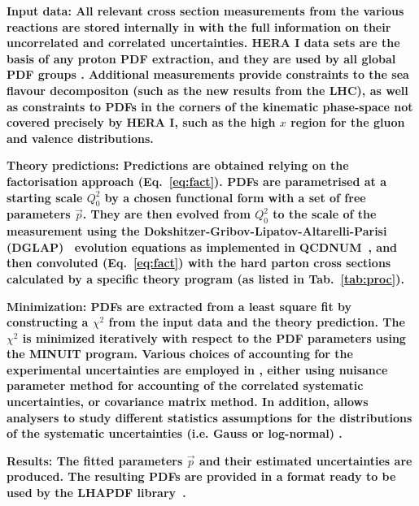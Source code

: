 \begin{description}
\item 
\bf {Input data:} \rm  All relevant cross section measurements from the various reactions
are stored internally in \fitter with the full information on their uncorrelated and correlated
uncertainties. HERA I data sets are the basis of any proton PDF extraction, and they are used by all global PDF groups \cite{MSTW, CT, NNPDF, ABM, JR}. Additional measurements provide constraints to the sea flavour decompositon (such as the new results from the LHC), as well as constraints to PDFs in the corners of the kinematic phase-space not covered precisely by HERA I, such as the high $x$ region for the gluon and valence distributions.
\item
\bf{Theory predictions:} \rm Predictions are obtained relying on the factorisation approach (Eq.~\ref{eq:fact}). PDFs are parametrised at a starting scale $Q_0^2$  by a chosen functional form with a set of free parameters $\vec{p}$. They are then evolved from $Q_0^2$ to the scale of the measurement using the 
Dokshitzer-Gribov-Lipatov-Altarelli-Parisi 
(DGLAP)~\cite{Gribov:1972ri, Gribov:1972rt, Lipatov:1974qm,
Dokshitzer:1977sg, Altarelli:1977zs} evolution equations 
as implemented in QCDNUM~\cite{qcdnum}, 
and then convoluted (Eq.~\ref{eq:fact}) with the hard parton cross sections calculated by
a specific theory program (as listed in Tab.~\ref{tab:proc}).
\item
\bf{Minimization:} \rm  PDFs are extracted from a least square fit by constructing a 
$\chi^2$ from the input data and the theory prediction.
The $\chi^2$ is  minimized iteratively 
with respect to the PDF parameters using the MINUIT\cite{minuit} program.
Various choices of accounting for the experimental uncertainties are employed in \fitter, 
either using nuisance parameter method for accounting of the correlated systematic uncertainties, or covariance matrix method. In addition, \fitter allows analysers to study different statistics assumptions for the distributions of the systematic uncertainties (i.e. Gauss or log-normal) \cite{arxiv.org/pdf/0901.2504.pdf}.
%
%
\item
\bf{Results:} \rm  The fitted parameters $\vec{p}$ and their estimated uncertainties are produced. 
The resulting PDFs are provided in a format ready to be used by the LHAPDF 
library~\cite{lhapdf,lhapdfweb}.

\end{description}
